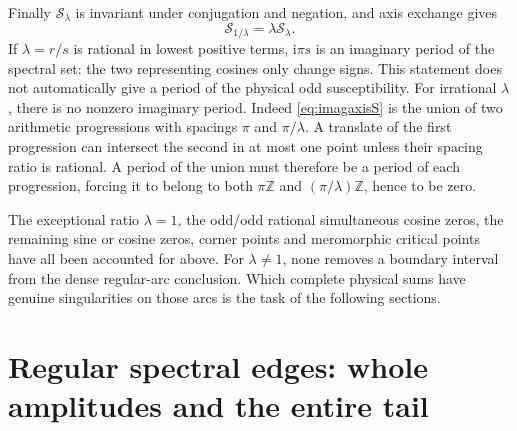 \documentclass[11pt]{article}
\numberwithin{equation}{section}
\theoremstyle{definition}
\newcommand{\Z}{\mathbb Z}
\newcommand{\ii}{\mathrm i}
\newcommand{\cS}{\mathcal S}
\begin{document}
Finally \(\cS_\lambda\) is invariant under conjugation and negation,
and axis exchange gives
\[
 \cS_{1/\lambda}=\lambda\cS_\lambda.
\]
If \(\lambda=r/s\) is rational in lowest positive terms,
\(\ii\pi s\) is an imaginary period of the spectral set: the two
representing cosines only change signs. This statement does not
automatically give a period of the physical odd susceptibility.
For irrational \(\lambda\), there is no nonzero imaginary period.
Indeed \eqref{eq:imagaxisS} is the union of two arithmetic progressions
with spacings \(\pi\) and \(\pi/\lambda\). A translate of the first
progression can intersect the second in at most one point unless
their spacing ratio is rational. A period of the union must therefore
be a period of each progression, forcing it to belong to both
\(\pi\Z\) and \((\pi/\lambda)\Z\), hence to be zero.

The exceptional ratio \(\lambda=1\), the odd/odd rational simultaneous
cosine zeros, the remaining sine or cosine zeros, corner points and
meromorphic critical points have all been accounted for above.
For \(\lambda\ne1\), none removes a boundary interval from the dense
regular-arc conclusion. Which complete physical sums have genuine
singularities on those arcs is the task of the following sections.



\section{Regular spectral edges: whole amplitudes and the entire tail}
\label{sec:regular}
\end{document}
